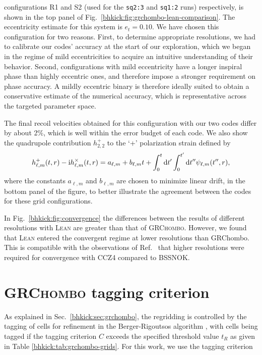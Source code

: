 configurations R1 and S2 (used for the \texttt{sq2:3} and \texttt{sq1:2} runs) 
respectively, is shown in the top panel of Fig.~\ref{bhkick:fig:grchombo-lean-comparison}.
The eccentricity estimate for this system is $e_t=0.10$. We have chosen
this configuration for two reasons. First, to determine appropriate
resolutions, we had to calibrate our codes' accuracy at the start of
our exploration, which we began in the regime of mild eccentricities to
acquire an intuitive understanding of their behavior. Second, 
configurations with mild eccentricity have a longer inspiral phase
than highly eccentric ones, and therefore impose a stronger requirement
on phase accuracy. A mildly eccentric binary is therefore ideally suited
to obtain a conservative estimate of the numerical accuracy, which is representative across the targeted parameter space.

The final recoil velocities obtained for this configuration with
our two codes differ by about 2\%, which is well within the error budget 
of each code.
We also show the quadrupole contribution
$h^+_{2,2}$ to the `+' polarization strain defined by \cite{Bishop:2016lgv}
\begin{equation}
    h^+_{\ell,m}(t,r)-\mathrm{i}h^\times_{\ell,m}(t,r) 
    = a_{\ell,m} + b_{\ell,m}t + \int_0^t\mathrm{d} t^\prime\int_0^{t^\prime}
    \mathrm{d} t^{\prime\prime}\psi_{\ell,m}(t^{\prime\prime},r),
    \label{bhkick:eq:strain}
\end{equation}
where the constants $a_{\ell,m}$ and $b_{\ell,m}$ are chosen to minimize 
linear drift,
in the bottom panel of the figure, to better illustrate the agreement
between the codes for these grid configurations.

In Fig.~\ref{bhkick:fig:convergence} the differences between the results of 
different resolutions with \textsc{Lean} are greater than that of
\textsc{GRChombo}. However, we found that \textsc{Lean} entered the 
convergent regime at lower resolutions than GRChombo. This is compatible 
with the observations of Ref.~\cite{Alic:2011gg} that higher resolutions 
were required for convergence with CCZ4 compared to BSSNOK.




\section{\textsc{GRChombo} tagging criterion}
\label{bhkick:sec:tagging}
%
%
As explained in Sec.~\ref{bhkick:sec:grchombo}, the regridding is controlled by 
the tagging of cells for refinement in the Berger-Rigoutsos algorithm 
\cite{Berger1991}, with cells being tagged if the tagging criterion $C$ 
exceeds the specified threshold value $t_R$ as given in Table 
\ref{bhkick:tab:grchombo-grids}. For this work, we use the 
tagging criterion

